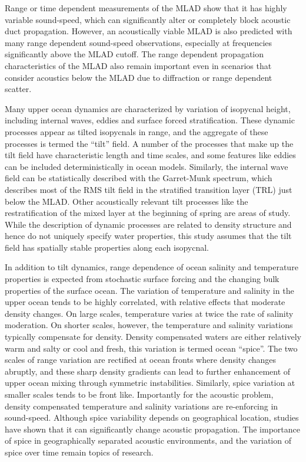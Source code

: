 \documentclass[preprint,NumberedRefs]{JASA}
\begin{document}
Range or time dependent measurements of the MLAD show that it has highly variable sound-speed,\citep{cole2010seasonal,rudnick1999compensation,klymak2015} which can significantly alter or completely block acoustic duct propagation.\citep{colosi2020observations,colosi21} However, an acoustically viable MLAD is also predicted with many range dependent sound-speed observations, especially at frequencies significantly above the MLAD cutoff. The range dependent propagation characteristics of the MLAD also remain important even in scenarios that consider acoustics below the MLAD due to diffraction or range dependent scatter.\citep{colosi21}

Many upper ocean dynamics are characterized by variation of isopycnal height, including internal waves, eddies and surface forced stratification. These dynamic processes appear as tilted isopycnals in range, and the aggregate of these processes is termed the ``tilt'' field.\cite{dzieciuch2004} A number of the processes that make up the tilt field have characteristic length and time scales, and some features like eddies can be included deterministically in ocean models. Similarly, the internal wave field can be statistically described with the Garret-Munk spectrum,\cite{garrett1972space} which describes most of the RMS tilt field in the stratified transition layer (TRL) just below the MLAD. Other acoustically relevant tilt processes like the restratification of the mixed layer at the beginning of spring are areas of study.\cite{cole2010seasonal} While the description of dynamic processes are related to density structure and hence do not uniquely specify water properties, this study assumes that the tilt field has spatially stable properties along each isopycnal.

In addition to tilt dynamics, range dependence of ocean salinity and temperature properties is expected from stochastic surface forcing and the changing bulk properties of the surface ocean\citep{ferrari2000}. The variation of temperature and salinity in the upper ocean tends to be highly correlated, with relative effects that moderate density changes. On large scales, temperature varies at twice the rate of salinity moderation. On shorter scales, however, the temperature and salinity variations typically compensate for density. Density compensated waters are either relatively warm and salty or cool and fresh, this variation is termed ocean ``spice''\citep{munk1981evolution}. The two scales of range variation are rectified at ocean fronts where density changes abruptly, and these sharp density gradients can lead to further enhancement of upper ocean mixing through symmetric instabilities\citep{dasaro2011}. Similarly, spice variation at smaller scales tends to be front like.\cite{rudnick1999compensation} Importantly for the acoustic problem, density compensated temperature and salinity variations are re-enforcing in sound-speed. Although spice variability depends on geographical location, studies have shown that it can significantly change acoustic propagation.\citep{colosi12,colosi13,murat2021} The importance of spice in geographically separated acoustic environments, and the variation of spice over time remain topics of research.
\end{document}
